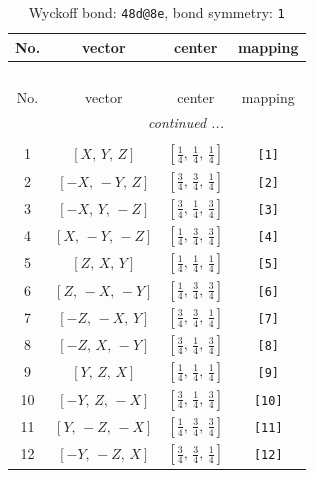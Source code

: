 \documentclass[fleqn,8pt]{jsarticle}
\begin{document}
\begin{longtable}{cccc}
\caption{Wyckoff bond: {\tt 48d@8e}, bond symmetry: {\tt 1}}
 \\
 \hline \hline
No. & vector & center & mapping \\ \hline \endfirsthead

\multicolumn{3}{l}{\tablename\ \thetable{}} \\
 \hline \hline
No. & vector & center & mapping \\ \hline \endhead

 \hline \hline
\multicolumn{3}{r}{\footnotesize\it continued ...} \\ \endfoot

 \hline \hline
\multicolumn{3}{r}{} \\ \endlastfoot

1 & $\left[ X,\, Y,\, Z \right]$ & $\left[ \frac{1}{4},\, \frac{1}{4},\, \frac{1}{4} \right]$ & {\tt [1]} \\ \hline
2 & $\left[ - X,\, - Y,\, Z \right]$ & $\left[ \frac{3}{4},\, \frac{3}{4},\, \frac{1}{4} \right]$ & {\tt [2]} \\ \hline
3 & $\left[ - X,\, Y,\, - Z \right]$ & $\left[ \frac{3}{4},\, \frac{1}{4},\, \frac{3}{4} \right]$ & {\tt [3]} \\ \hline
4 & $\left[ X,\, - Y,\, - Z \right]$ & $\left[ \frac{1}{4},\, \frac{3}{4},\, \frac{3}{4} \right]$ & {\tt [4]} \\ \hline
5 & $\left[ Z,\, X,\, Y \right]$ & $\left[ \frac{1}{4},\, \frac{1}{4},\, \frac{1}{4} \right]$ & {\tt [5]} \\ \hline
6 & $\left[ Z,\, - X,\, - Y \right]$ & $\left[ \frac{1}{4},\, \frac{3}{4},\, \frac{3}{4} \right]$ & {\tt [6]} \\ \hline
7 & $\left[ - Z,\, - X,\, Y \right]$ & $\left[ \frac{3}{4},\, \frac{3}{4},\, \frac{1}{4} \right]$ & {\tt [7]} \\ \hline
8 & $\left[ - Z,\, X,\, - Y \right]$ & $\left[ \frac{3}{4},\, \frac{1}{4},\, \frac{3}{4} \right]$ & {\tt [8]} \\ \hline
9 & $\left[ Y,\, Z,\, X \right]$ & $\left[ \frac{1}{4},\, \frac{1}{4},\, \frac{1}{4} \right]$ & {\tt [9]} \\ \hline
10 & $\left[ - Y,\, Z,\, - X \right]$ & $\left[ \frac{3}{4},\, \frac{1}{4},\, \frac{3}{4} \right]$ & {\tt [10]} \\ \hline
11 & $\left[ Y,\, - Z,\, - X \right]$ & $\left[ \frac{1}{4},\, \frac{3}{4},\, \frac{3}{4} \right]$ & {\tt [11]} \\ \hline
12 & $\left[ - Y,\, - Z,\, X \right]$ & $\left[ \frac{3}{4},\, \frac{3}{4},\, \frac{1}{4} \right]$ & {\tt [12]} \\ \hline

\end{longtable}
\end{document}
